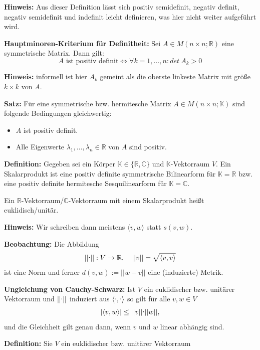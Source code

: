 \documentclass{article}
\let\oldcdot\cdot
\renewcommand{\cdot}{\raisebox{0.1ex}{$\oldcdot$}}
\begin{document}
\textbf{Hinweis:} Aus dieser Definition lässt sich positiv semidefinit, negativ
definit, negativ semidefinit und indefinit leicht definieren, was hier nicht
weiter aufgeführt wird.

\textbf{Hauptminoren-Kriterium für Definitheit:} Sei $A\in M(n\times
n;\mathbb{R})$ eine symmetrische Matrix. Dann gilt:
\begin{equation*}
	A\text{ ist positiv definit} \iff \forall k=1,\dots,n: det\ A_k>0 
\end{equation*}

\textbf{Hinweis:} informell ist hier $A_k$ gemeint als die oberste linkeste
Matrix mit größe $k\times k$ von $A$.

\textbf{Satz:} Für eine symmetrische bzw. hermitesche Matrix $A\in M(n\times n;
\mathbb{K})$ sind folgende Bedingungen gleichwertig:
\begin{itemize}
\item[i)] $A$ ist positiv definit.
\item[ii)] Alle Eigenwerte $\lambda_1,\dots, \lambda_n\in\mathbb{R}$ von $A$
	sind positiv.
\end{itemize}

\textbf{Definition:} Gegeben sei ein Körper $\mathbb{K}\in\{\mathbb{R,C}\}$ und
$\mathbb{K}$-Vektorraum $V$. Ein Skalarprodukt ist eine positiv definite
symmetrische Bilinearform für $\mathbb{K}=\mathbb{R}$ bzw. eine positiv
definite hermitesche Sesquilinearform für $\mathbb{K}=\mathbb{C}$. 

Ein $\mathbb{R}$-Vektorraum/$\mathbb{C}$-Vektorraum mit einem Skalarprodukt
heißt euklidisch/unitär.

\textbf{Hinweis:} Wir schreiben dann meistens $\langle v,w\rangle$ statt
$s(v,w)$.

\textbf{Beobachtung:} Die Abbildung 
\begin{equation*}
||\cdot||:V\to\mathbb{R},\quad ||v||=\sqrt{\langle v,v\rangle}
\end{equation*}
ist eine Norm und ferner $d(v,w):=||w-v||$ eine (induzierte) Metrik.

\textbf{Ungleichung von Cauchy-Schwarz:} Ist $V$ ein euklidischer bzw. unitärer
Vektorraum und $||\cdot||$ induziert aus $\langle\cdot,\cdot\rangle$ so gilt
für alle $v,w\in V$
\begin{equation*}
	|\langle v,w\rangle|\leq||v||\cdot||w||,
\end{equation*}
und die Gleichheit gilt genau dann, wenn $v$ und $w$ linear abhängig sind.

\newpage
\textbf{Definition:} Sie $V$ ein euklidischer bzw. unitärer Vektorraum
\end{document}
